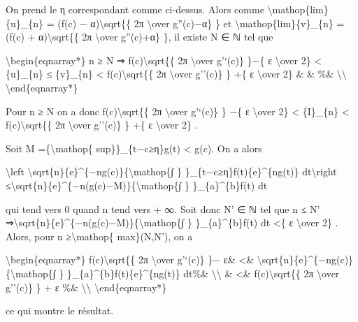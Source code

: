 \documentclass[]{article}
\begin{document}
On prend le η correspondant comme ci-dessus. Alors comme
\textbackslash{}mathop\{lim\}\{u\}\_\{n\} = (f(c) −
α)\textbackslash{}sqrt\{\{ 2π \textbackslash{}over
\textbar{}g''(c)−α\textbar{}\} \} et
\textbackslash{}mathop\{lim\}\{v\}\_\{n\} = (f(c) +
α)\textbackslash{}sqrt\{\{ 2π \textbackslash{}over
\textbar{}g''(c)+α\textbar{}\} \}, il existe N ∈ ℕ tel que

\textbackslash{}begin\{eqnarray*\} n ≥ N ⇒ f(c)\textbackslash{}sqrt\{\{
2π \textbackslash{}over \textbar{}g'`(c)\textbar{}\} \}−\{ ε
\textbackslash{}over 2\} \textless{} \{u\}\_\{n\} ≤ \{v\}\_\{n\}
\textless{} f(c)\textbackslash{}sqrt\{\{ 2π \textbackslash{}over
\textbar{}g''(c)\textbar{}\} \} +\{ ε \textbackslash{}over 2\} \& \&
\%\& \textbackslash{}\textbackslash{} \textbackslash{}end\{eqnarray*\}

Pour n ≥ N on a donc f(c)\textbackslash{}sqrt\{\{ 2π
\textbackslash{}over \textbar{}g'`(c)\textbar{}\} \} −\{ ε
\textbackslash{}over 2\} \textless{} \{I\}\_\{n\} \textless{}
f(c)\textbackslash{}sqrt\{\{ 2π \textbackslash{}over
\textbar{}g''(c)\textbar{}\} \} +\{ ε \textbackslash{}over 2\} .

Soit M =\{\textbackslash{}mathop\{
sup\}\}\_\{\textbar{}t−c\textbar{}≥η\}g(t) \textless{} g(c). On a alors

\textbackslash{}left
\textbar{}\textbackslash{}sqrt\{n\}\{e\}\^{}\{−ng(c)\}\{\textbackslash{}mathop\{∫
\} \}\_\{\textbar{}t−c\textbar{}≥η\}f(t)\{e\}\^{}\{ng(t)\}
dt\textbackslash{}right
\textbar{}≤\textbackslash{}sqrt\{n\}\{e\}\^{}\{−n(g(c)−M)\}\{\textbackslash{}mathop\{∫
\} \}\_\{a\}\^{}\{b\}\textbar{}f(t)\textbar{} dt

qui tend vers 0 quand n tend vers + ∞. Soit donc N' ∈ ℕ tel que n ≤ N'
⇒\textbackslash{}sqrt\{n\}\{e\}\^{}\{−n(g(c)−M)\}\{\textbackslash{}mathop\{∫
\} \}\_\{a\}\^{}\{b\}\textbar{}f(t)\textbar{} dt \textless{}\{ ε
\textbackslash{}over 2\} . Alors, pour n ≥\textbackslash{}mathop\{
max\}(N,N'), on a

\textbackslash{}begin\{eqnarray*\} f(c)\textbackslash{}sqrt\{\{ 2π
\textbackslash{}over \textbar{}g'`(c)\textbar{}\} \}− ε\& \textless{}\&
\textbackslash{}sqrt\{n\}\{e\}\^{}\{−ng(c)\}\{\textbackslash{}mathop\{∫
\} \}\_\{a\}\^{}\{b\}f(t)\{e\}\^{}\{ng(t)\} dt\%\&
\textbackslash{}\textbackslash{} \& \textless{}\&
f(c)\textbackslash{}sqrt\{\{ 2π \textbackslash{}over
\textbar{}g''(c)\textbar{}\} \} + ε \%\&
\textbackslash{}\textbackslash{} \textbackslash{}end\{eqnarray*\}

ce qui montre le résultat.
\end{document}
